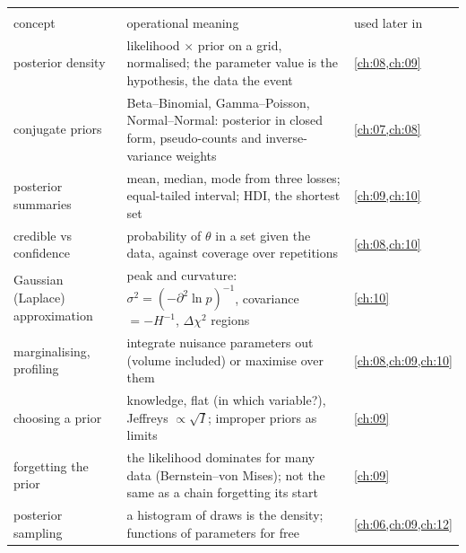 \begin{center}
\small
\renewcommand{\arraystretch}{1.15}
\begin{tabularx}{\linewidth}{@{}>{\raggedright\arraybackslash}p{3.3cm}
                               >{\raggedright\arraybackslash}X
                               >{\raggedright\arraybackslash}p{2.7cm}@{}}
\toprule
\multicolumn{3}{@{}l}{\textbf{Parameter estimation}}\\
concept & operational meaning & used later in\\\midrule
posterior density & likelihood $\times$ prior on a grid, normalised; the parameter value is the hypothesis, the data the event & \cref{ch:08,ch:09}\\
conjugate priors & Beta--Binomial, Gamma--Poisson, Normal--Normal: posterior in closed form, pseudo-counts and inverse-variance weights & \cref{ch:07,ch:08}\\
posterior summaries & mean, median, mode from three losses; equal-tailed interval; HDI, the shortest set & \cref{ch:09,ch:10}\\
credible vs confidence & probability of $\theta$ in a set given the data, against coverage over repetitions & \cref{ch:08,ch:10}\\
Gaussian (Laplace) approximation & peak and curvature: $\sigma^2=(-\partial^2\ln p)^{-1}$, covariance $=-H^{-1}$, $\Delta\chi^2$ regions & \cref{ch:10}\\
marginalising, profiling & integrate nuisance parameters out (volume included) or maximise over them & \cref{ch:08,ch:09,ch:10}\\
choosing a prior & knowledge, flat (in which variable?), Jeffreys $\propto\sqrt{I}$; improper priors as limits & \cref{ch:09}\\
forgetting the prior & the likelihood dominates for many data (Bernstein--von Mises); not the same as a chain forgetting its start & \cref{ch:09}\\
posterior sampling & a histogram of draws is the density; functions of parameters for free & \cref{ch:06,ch:09,ch:12}\\
\bottomrule
\end{tabularx}
\end{center}

